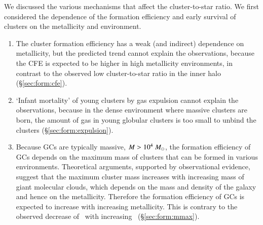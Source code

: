 \documentclass{aa}
\begin{document}
We discussed the various mechanisms that affect the cluster-to-star ratio. We first considered the dependence of the formation efficiency and early survival of clusters on the metallicity and environment.
\begin{enumerate}
\item[(i)] The cluster formation efficiency has a weak (and indirect) dependence on metallicity, but the predicted trend cannot explain the observations, because the CFE is expected to be higher in high metallicity environments, in contrast to the observed low cluster-to-star ratio in the inner halo (\S\ref{sec:form:cfe}).
\item[(ii)] `Infant mortality' of young clusters by gas expulsion cannot explain the observations, because in the dense environment where massive clusters are born, the amount of gas in young globular clusters is too small to unbind the clusters (\S\ref{sec:form:expulsion}).
\item[(iii)] Because GCs are typically massive, $M > 10^4 ~\mbox{$M_{\odot}$} $, the formation efficiency of GCs depends on the maximum mass of clusters that can be formed in various environments. Theoretical arguments, supported by observational evidence, suggest that the maximum cluster mass increases with increasing mass of giant molecular clouds, which depends on the mass and density of the galaxy and hence on the metallicity. Therefore the formation efficiency of GCs is expected to increase with increasing metallicity. This is contrary to the observed decrease of \Rgcst\ with increasing \feh\ (\S\ref{sec:form:mmax}).
\end{enumerate}
\end{document}
